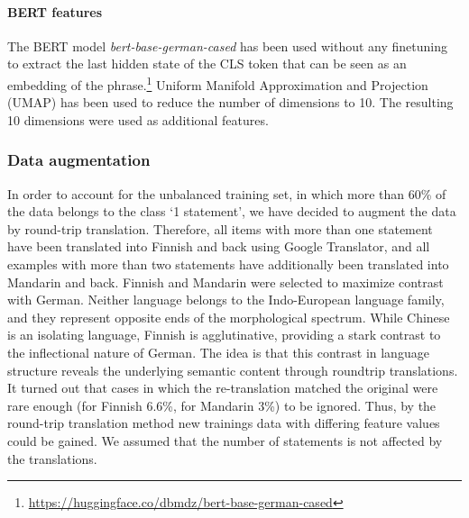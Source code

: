 \documentclass[11pt]{article}
\begin{document}
  
	   
\paragraph{BERT features}
The BERT model \textit{bert-base-german-cased} has been used without any finetuning to extract the last hidden state of the CLS token that can be seen as an embedding of the phrase.\footnote{\url{https://huggingface.co/dbmdz/bert-base-german-cased}} Uniform Manifold Approximation and Projection (UMAP) has been used to reduce the number of dimensions to 10. The resulting 10 dimensions were used as additional features.

\subsubsection{Data augmentation} \label{subsec:augmented}

In order to account for the unbalanced training set, in which more than 60\% of the data belongs to the class `1 statement', we have decided to augment the data by round-trip translation. Therefore, all items with more than one statement have been translated into Finnish and back using Google Translator, and all examples with more than two statements have additionally been translated into Mandarin and back.
Finnish and Mandarin were selected
to maximize contrast with German. Neither language belongs to the Indo-European language family, and they represent opposite ends of the morphological spectrum. While Chinese is an isolating language, Finnish is agglutinative, providing a stark contrast to the inflectional nature of German. The idea is that this contrast in language structure reveals the underlying semantic content through roundtrip translations. It turned out that cases in which the re-translation matched the original were rare enough (for Finnish 6.6\%, for Mandarin 3\%) to be ignored. Thus, by the round-trip translation method new trainings data with differing feature values could be gained. We assumed that the number of statements is not affected by the translations.
\end{document}
